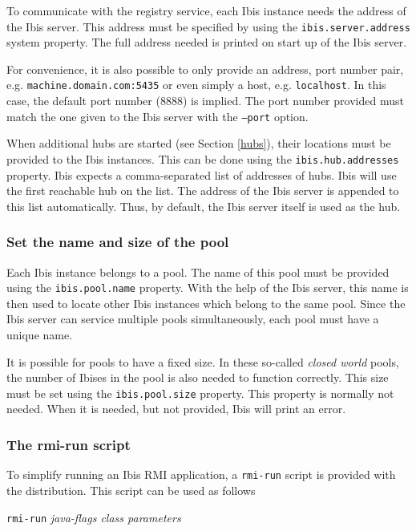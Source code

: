 \documentclass[a4paper,10pt]{article}
\begin{document}
To communicate with the registry service, each Ibis instance needs the address
of the Ibis server. This address must be specified by using the
\texttt{ibis.server.address} system property. The full address needed is
printed on start up of the Ibis server.

For convenience, it is also possible to only provide an address, port number
pair, e.g. \texttt{machine.domain.com:5435} or even simply a host, e.g.
\texttt{localhost}. In this case, the default port number (8888) is implied.
The port number provided must match the one given to the Ibis server
with the \texttt{--port} option.

When additional hubs are started (see Section \ref{hubs}), their locations
must be provided to the Ibis instances. This can be done using
the \texttt{ibis.hub.addresses} property. Ibis expects a comma-separated
list of addresses of hubs. Ibis will use the first reachable hub on the
list. The address of the Ibis server is appended to this list
automatically. Thus, by default, the Ibis server itself is used as the
hub.

\subsubsection{Set the name and size of the pool}

Each Ibis instance belongs to a pool. The name of this pool must be provided
using the \texttt{ibis.pool.name} property. With the help of the Ibis server,
this name is then used to locate other Ibis instances which belong to the
same pool. Since the Ibis server can service multiple pools simultaneously,
each pool must have a unique name.

It is possible for pools to have a fixed size. In these so-called \emph{closed
world} pools, the number of Ibises in the pool is also needed to function
correctly. This size must be set using the \texttt{ibis.pool.size} property.
This property is normally not needed. When it is needed, but not provided, Ibis
will print an error. 

\subsubsection{The rmi-run script}

To simplify running an Ibis RMI application, a \texttt{rmi-run} script is
provided with the distribution. This script can be
used as follows

\begin{center}
\texttt{rmi-run} \emph{java-flags class parameters}
\end{center}
\end{document}
